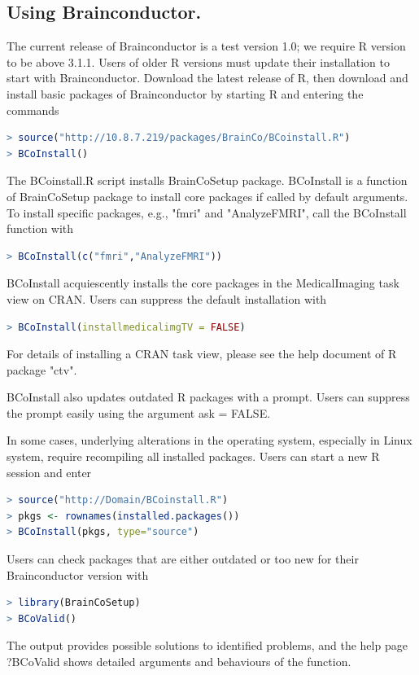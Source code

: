 \documentclass{nature}
\begin{document}
\begin{methods}
\section{Using Brainconductor.}
The current release of Brainconductor is a test version
1.0; we require R version to be above 3.1.1. Users of older R versions must
update their installation to start with Brainconductor. Download the latest
release of R, then download and install basic packages of Brainconductor by
starting R and entering the commands
\begin{lstlisting}[language = R]
> source("http://10.8.7.219/packages/BrainCo/BCoinstall.R")
> BCoInstall()
\end{lstlisting}
The BCoinstall.R script installs BrainCoSetup package. BCoInstall is a function
of BrainCoSetup package to install core packages if called by default arguments.
To install specific packages, e.g., "fmri" and "AnalyzeFMRI", call the
BCoInstall function with
\begin{lstlisting}[language = R]
> BCoInstall(c("fmri","AnalyzeFMRI"))
\end{lstlisting}
BCoInstall acquiescently installs the core packages in the MedicalImaging task
view on CRAN. Users can suppress the default installation with
\begin{lstlisting}[language = R]
> BCoInstall(installmedicalimgTV = FALSE)
\end{lstlisting}
For details of installing a CRAN task view, please see the help document of R
package "ctv".

BCoInstall also updates outdated R packages with a prompt. Users can suppress
the prompt easily using the argument ask = FALSE.

In some cases, underlying alterations in the operating system, especially in
Linux system, require recompiling all installed packages. Users can start a new
R session and enter
\begin{lstlisting}[language = R]
> source("http://Domain/BCoinstall.R")
> pkgs <- rownames(installed.packages())
> BCoInstall(pkgs, type="source")
\end{lstlisting}

Users can check packages that are either outdated or too new for their
Brainconductor version with
\begin{lstlisting}[language = R]
> library(BrainCoSetup)
> BCoValid()
\end{lstlisting}
The output provides possible solutions to identified problems, and the help page
?BCoValid shows detailed arguments and behaviours of the function.





\end{methods}
\end{document}
